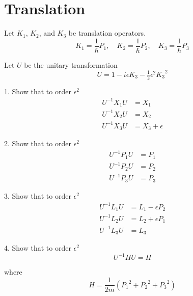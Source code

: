 

\section*{Translation}

Let $K_1$, $K_2$, and $K_3$ be translation operators.
\begin{equation*}
K_1=\frac{1}{\hbar}P_1,\quad K_2=\frac{1}{\hbar}P_2,\quad K_3=\frac{1}{\hbar}P_3
\end{equation*}

Let $U$ be the unitary transformation
\begin{equation*}
U=1-i\epsilon K_3-\tfrac{1}{2}\epsilon^2{K_3}^2
\end{equation*}

1. Show that to order $\epsilon^2$
\begin{align*}
U^{-1}X_1U&=X_1
\\
U^{-1}X_2U&=X_2
\\
U^{-1}X_3U&=X_3+\epsilon
\end{align*}

2. Show that to order $\epsilon^2$
\begin{align*}
U^{-1}P_1U&=P_1
\\
U^{-1}P_2U&=P_2
\\
U^{-1}P_3U&=P_3
\end{align*}

3. Show that to order $\epsilon^2$
\begin{align*}
U^{-1}L_1U&=L_1-\epsilon P_2
\\
U^{-1}L_2U&=L_2+\epsilon P_1
\\
U^{-1}L_3U&=L_3
\end{align*}

4. Show that to order $\epsilon^2$
\begin{equation*}
U^{-1}HU=H
\end{equation*}

where
\begin{equation*}
H=\frac{1}{2m}\left({P_1}^2+{P_2}^2+{P_3}^2\right)
\end{equation*}


